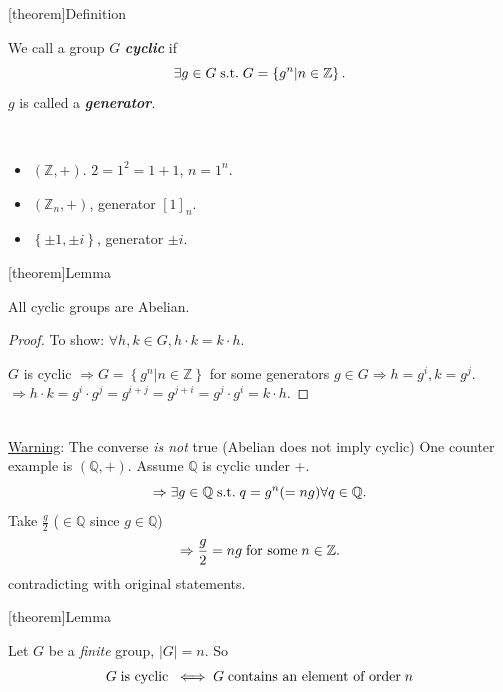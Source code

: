 \documentclass[12pt]{report}
\theoremstyle{definition}
\begin{document}
[theorem]{Definition}
\begin{cyclic group}
    We call a group $G$ \textbf{\emph{cyclic}} if \[
        \exists g \in G \;\textnormal{s.t.}\; G = \left\{g^{n} | n \in \mathbb{Z}\right\}%
.\]
    $g$ is called a \textbf{\emph{generator}}.
\end{cyclic group}

\begin{ex}
    \,

    \begin{itemize}
        \item $(\mathbb{Z}, +)$.
            $2 = 1^{2} = 1 + 1$, $n = 1^{n}$.
        \item $(\mathbb{Z}_n, +)$, generator ${[1]}_{n}$.
        \item $\left\{\pm 1, \pm i\right\} $, generator $\pm i$.
    \end{itemize}
    
\end{ex}

[theorem]{Lemma}
\begin{cyclic groups are Abelian}
    All cyclic groups are Abelian.
\end{cyclic groups are Abelian}

\begin{proof}
    To show: $\forall h, k \in G, h \cdot k = k \cdot h$.

    $G$ is cyclic 
    $\Rightarrow{} G = \left\{g^{n} | n \in{}\mathbb{Z}\right\} $
    for some generators $g \in G \Rightarrow h = g^{i}, k = g^{j}$.
    \\$\Rightarrow{} h \cdot k = g^{i} \cdot g^{j} = g^{i + j} = g^{j + i} = g^{j} \cdot g^{i} = k \cdot h$.
\end{proof}
\\\underline{Warning}: The converse \emph{is not} true (Abelian does not imply cyclic)
One counter example is $ (\mathbb{Q}, +)$.
Assume $\mathbb{Q}$ is cyclic under +. \[
    \Rightarrow \exists g \in \mathbb{Q} \;\textnormal{s.t.}\; q = g^{n} (= ng) \forall q \in \mathbb{Q}.
\]
Take $\frac{g}{2}$ ($\in \mathbb{Q}$ since $g \in \mathbb{Q}$)\[
    \Rightarrow \frac{g}{2} = ng \;\textnormal{for some}\; n \in \mathbb{Z}.
\]contradicting with original statements.

[theorem]{Lemma}
\begin{G has element of order n}
    Let $G$ be a \emph{finite} group, $|G| = n$. So \[
        G \;\textnormal{is cyclic}\; \iff G \;\textnormal{contains an element of order}\; n
    \]
\end{G has element of order n}
\end{document}
